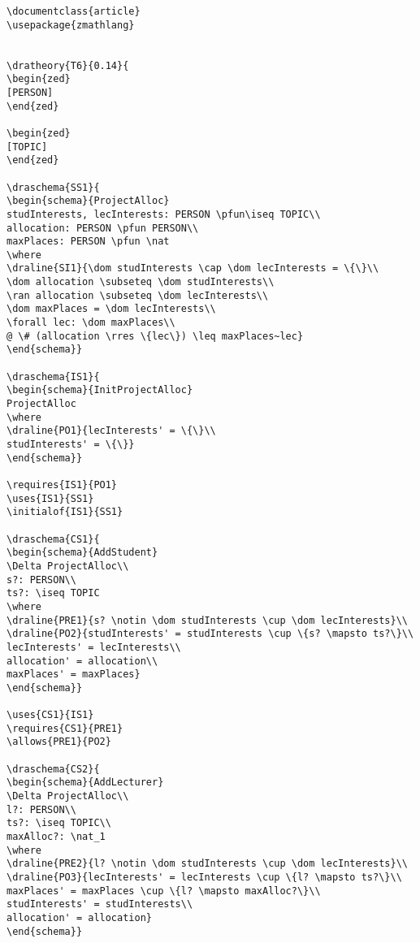 \begin{verbatim}
\documentclass{article}
\usepackage{zmathlang}


\dratheory{T6}{0.14}{
\begin{zed}
[PERSON]
\end{zed}

\begin{zed}
[TOPIC]
\end{zed}

\draschema{SS1}{
\begin{schema}{ProjectAlloc}
studInterests, lecInterests: PERSON \pfun\iseq TOPIC\\
allocation: PERSON \pfun PERSON\\
maxPlaces: PERSON \pfun \nat
\where
\draline{SI1}{\dom studInterests \cap \dom lecInterests = \{\}\\
\dom allocation \subseteq \dom studInterests\\
\ran allocation \subseteq \dom lecInterests\\
\dom maxPlaces = \dom lecInterests\\
\forall lec: \dom maxPlaces\\
@ \# (allocation \rres \{lec\}) \leq maxPlaces~lec}
\end{schema}}

\draschema{IS1}{
\begin{schema}{InitProjectAlloc}
ProjectAlloc
\where
\draline{PO1}{lecInterests' = \{\}\\
studInterests' = \{\}}
\end{schema}}

\requires{IS1}{PO1}
\uses{IS1}{SS1}
\initialof{IS1}{SS1}

\draschema{CS1}{
\begin{schema}{AddStudent}
\Delta ProjectAlloc\\
s?: PERSON\\
ts?: \iseq TOPIC
\where
\draline{PRE1}{s? \notin \dom studInterests \cup \dom lecInterests}\\
\draline{PO2}{studInterests' = studInterests \cup \{s? \mapsto ts?\}\\
lecInterests' = lecInterests\\
allocation' = allocation\\
maxPlaces' = maxPlaces}
\end{schema}}

\uses{CS1}{IS1}
\requires{CS1}{PRE1}
\allows{PRE1}{PO2}

\draschema{CS2}{
\begin{schema}{AddLecturer}
\Delta ProjectAlloc\\
l?: PERSON\\
ts?: \iseq TOPIC\\
maxAlloc?: \nat_1
\where
\draline{PRE2}{l? \notin \dom studInterests \cup \dom lecInterests}\\
\draline{PO3}{lecInterests' = lecInterests \cup \{l? \mapsto ts?\}\\
maxPlaces' = maxPlaces \cup \{l? \mapsto maxAlloc?\}\\
studInterests' = studInterests\\
allocation' = allocation}
\end{schema}}


\end{verbatim}
